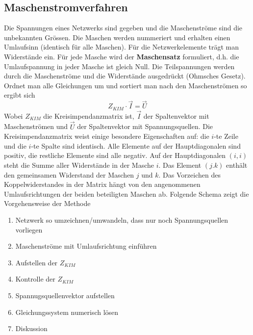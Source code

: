 \subsection{Maschenstromverfahren}
Die Spannungen eines Netzwerks sind gegeben und die Maschenströme sind die unbekannten Grössen. Die Maschen werden nummeriert und erhalten einen Umlaufsinn (identisch für alle Maschen). Für die Netzwerkelemente trägt man Widerstände ein.
\newline\newline
Für jede Masche wird der \textbf{Maschensatz} formuliert, d.h. die Umlaufspannung in jeder Masche ist gleich Null. Die Teilspannungen werden durch die Maschenströme und die Widerstände ausgedrückt (Ohmsches Gesetz). Ordnet man alle Gleichungen um und sortiert man nach den Maschenströmen so ergibt sich
\begin{equation}
\boxed{Z_{KIM}\cdot \overrightarrow{I}=\overrightarrow{U}}
\end{equation}
Wobei $Z_{KIM}$ die Kreisimpendanzmatrix ist, $\overrightarrow{I}$ der Spaltenvektor mit Maschenströmen und $\overrightarrow{U}$ der Spaltenvektor mit Spannungsquellen.
\newline\newline
Die Kreisimpendanzmatrix weist einige besondere Eigenschaften auf: die $i$-te Zeile und die $i$-te Spalte sind identisch. Alle Elemente auf der Hauptdiagonalen sind positiv, die restliche Elemente sind alle negativ. Auf der Hauptdiagonalen $\left(i, i\right)$ steht die Summe aller Widerstände in der Masche $i$. Das Element $\left(j.k\right)$ enthält den gemeinsamen Widerstand der Maschen $j$ und $k$. Das Vorzeichen des Koppelwiderstandes in der Matrix hängt von den angenommenen Umlaufsrichtungen der beiden beteiligten Maschen ab.
\newline\newline
Folgende Schema zeigt die Vorgehensweise der Methode
\begin{enumerate}
\item Netzwerk so umzeichnen/umwandeln, dass nur noch Spannungsquellen vorliegen
\item Maschenströme mit Umlaufsrichtung einführen
\item Aufstellen der $Z_{KIM}$
\item Kontrolle der $Z_{KIM}$
\item Spannugsquellenvektor aufstellen
\item Gleichungssystem numerisch lösen
\item Diskussion
\end{enumerate}
